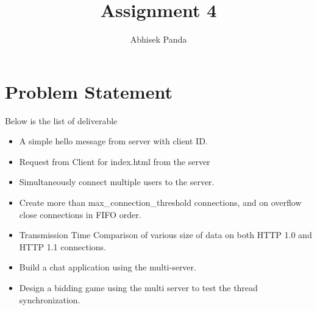 \documentclass[a4paper]{article}
\title{Assignment 4}
\author{Abhisek Panda}
\begin{document}
\maketitle

\section{Problem Statement}

Below is the list of deliverable
 \begin{itemize}
 \item A simple hello message from server with client ID. 
 \item Request from Client for index.html from the server
 \item Simultaneously connect multiple users to the server.
 \item Create more than max\_connection\_threshold connections, and on overflow close connections in FIFO order.
 \item Transmission Time Comparison of various size of data on both HTTP 1.0 and HTTP 1.1 connections.
 \item Build a chat application using the multi-server.
 \item Design a bidding game using the multi server to test the thread synchronization.
 \end{itemize}
\end{document}
